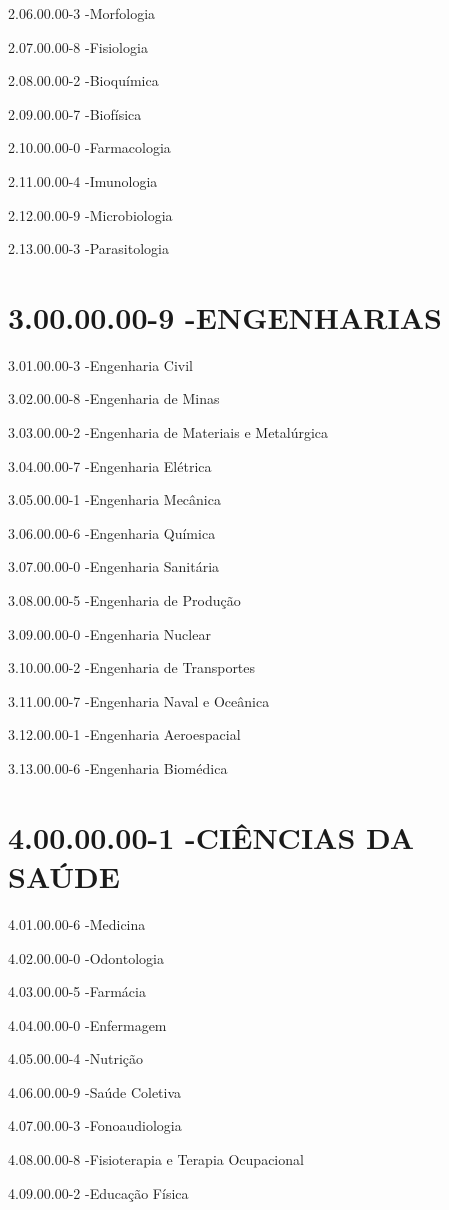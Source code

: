 2.06.00.00-3 -Morfologia

2.07.00.00-8 -Fisiologia

2.08.00.00-2 -Bioquímica

2.09.00.00-7 -Biofísica

2.10.00.00-0 -Farmacologia

2.11.00.00-4 -Imunologia

2.12.00.00-9 -Microbiologia

2.13.00.00-3 -Parasitologia

\section*{3.00.00.00-9 -ENGENHARIAS}

3.01.00.00-3 -Engenharia Civil

3.02.00.00-8 -Engenharia de Minas

3.03.00.00-2 -Engenharia de Materiais e Metalúrgica

3.04.00.00-7 -Engenharia Elétrica

3.05.00.00-1 -Engenharia Mecânica

3.06.00.00-6 -Engenharia Química

3.07.00.00-0 -Engenharia Sanitária

3.08.00.00-5 -Engenharia de Produção

3.09.00.00-0 -Engenharia Nuclear

3.10.00.00-2 -Engenharia de Transportes

3.11.00.00-7 -Engenharia Naval e Oceânica

3.12.00.00-1 -Engenharia Aeroespacial

3.13.00.00-6 -Engenharia Biomédica

\section*{4.00.00.00-1 -CIÊNCIAS DA SAÚDE}

4.01.00.00-6 -Medicina

4.02.00.00-0 -Odontologia

4.03.00.00-5 -Farmácia

4.04.00.00-0 -Enfermagem

4.05.00.00-4 -Nutrição

4.06.00.00-9 -Saúde Coletiva

4.07.00.00-3 -Fonoaudiologia

4.08.00.00-8 -Fisioterapia e Terapia Ocupacional

4.09.00.00-2 -Educação Física

